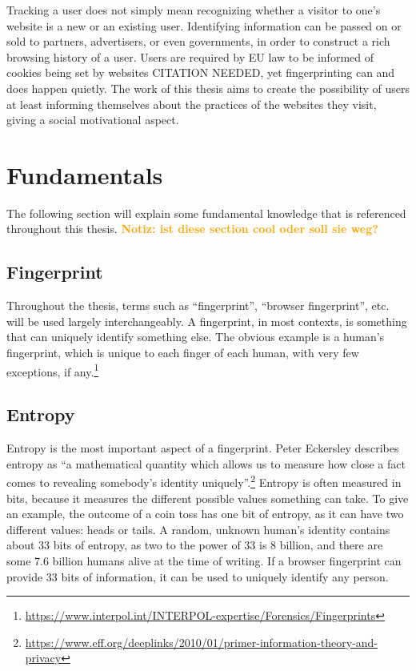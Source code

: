 \documentclass[
    fontsize=12pt,
    headings=small,
    parskip=half,
    bibliography=totoc,
    numbers=noenddot,
    open=any
    ]{scrreprt}
\newcommand{\dominik}[1]{\textcolor{orange}{\textbf{Notiz: #1}}}
\begin{document}
Tracking a user does not simply mean recognizing whether a visitor to one's website is a new or an existing user.
Identifying information can be passed on or sold to partners, advertisers, or even governments, in order to
construct a rich browsing history of a user. Users are required by EU law to be informed of cookies being set
by websites CITATION NEEDED, yet fingerprinting can and does happen quietly.
The work of this thesis aims to create the possibility of users at least informing themselves about the practices
of the websites they visit, giving a social motivational aspect.

\section{Fundamentals}
The following section will explain some fundamental knowledge that is
referenced throughout this thesis.
\dominik{ist diese section cool oder soll sie weg?}

\subsection{Fingerprint}
\label{fundamentals:fingerprint}
Throughout the thesis, terms such as ``fingerprint'', ``browser fingerprint'', etc.
will be used largely interchangeably.
A fingerprint, in most contexts, is something that can uniquely identify something else.
The obvious example is a human's fingerprint, which is unique to each finger of each human,
with very few exceptions, if any.\footnote{\url{https://www.interpol.int/INTERPOL-expertise/Forensics/Fingerprints}}

\subsection{Entropy}
\label{fundamentals:entropy}
Entropy is the most important aspect of a fingerprint.
Peter Eckersley describes entropy as
``a mathematical quantity which allows us to measure how close a fact comes to revealing somebody's identity uniquely''.\footnote{\url{https://www.eff.org/deeplinks/2010/01/primer-information-theory-and-privacy}}
Entropy is often measured in bits, because it measures the different
possible values something can take.
To give an example, the outcome of a coin toss has one bit of entropy,
as it can have two different values: heads or tails.
A random, unknown human's identity contains about 33 bits of entropy,
as two to the power of 33 is 8 billion, and there are some 7.6 billion humans
alive at the time of writing.
If a browser fingerprint can provide 33 bits of information, it can be used
to uniquely identify any person.
\end{document}
